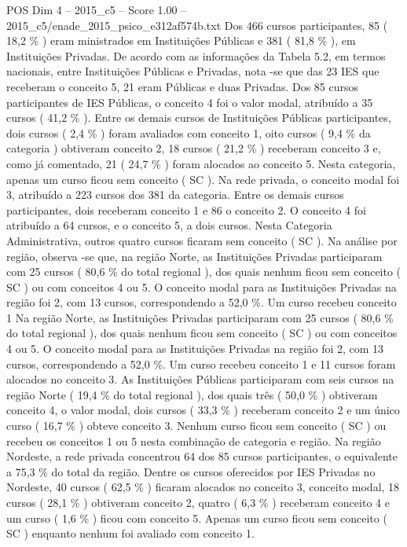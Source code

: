 \begin{textsample}{POS Dim 4 – 2015\_c5 – Score 1.00 – 2015\_c5/enade\_2015\_psico\_e312af574b.txt}
Dos 466 cursos participantes, 85 ( 18,2 \% ) eram ministrados em Instituições Públicas e 381 ( 81,8 \% ), em Instituições Privadas.
De acordo com as informações da Tabela 5.2, em termos nacionais, entre Instituições Públicas e Privadas, nota -se que das 23 IES que receberam o conceito 5, 21 eram Públicas e duas Privadas.
Dos 85 cursos participantes de IES Públicas, o conceito 4 foi o valor modal, atribuído a 35 cursos ( 41,2 \% ).
Entre os demais cursos de Instituições Públicas participantes, dois cursos ( 2,4 \% ) foram avaliados com conceito 1, oito cursos ( 9,4 \% da categoria ) obtiveram conceito 2, 18 cursos ( 21,2 \% ) receberam conceito 3 e, como já comentado, 21 ( 24,7 \% ) foram alocados ao conceito 5.
Nesta categoria, apenas um curso ficou sem conceito ( SC ).
Na rede privada, o conceito modal foi 3, atribuído a 223 cursos dos 381 da categoria.
Entre os demais cursos participantes, dois receberam conceito 1 e 86 o conceito 2.
O conceito 4 foi atribuído a 64 cursos, e o conceito 5, a dois cursos.
Nesta Categoria Administrativa, outros quatro cursos ficaram sem conceito ( SC ).
Na análise por região, observa -se que, na região Norte, as Instituições Privadas participaram com 25 cursos ( 80,6 \% do total regional ), dos quais nenhum ficou sem conceito ( SC ) ou com conceitos 4 ou 5.
O conceito modal para as Instituições Privadas na região foi 2, com 13 cursos, correspondendo a 52,0 \%.
Um curso recebeu conceito 1 Na região Norte, as Instituições Privadas participaram com 25 cursos ( 80,6 \% do total regional ), dos quais nenhum ficou sem conceito ( SC ) ou com conceitos 4 ou 5.
O conceito modal para as Instituições Privadas na região foi 2, com 13 cursos, correspondendo a 52,0 \%.
Um curso recebeu conceito 1 e 11 cursos foram alocados no conceito 3.
As Instituições Públicas participaram com seis cursos na região Norte ( 19,4 \% do total regional ), dos quais três ( 50,0 \% ) obtiveram conceito 4, o valor modal, dois cursos ( 33,3 \% ) receberam conceito 2 e um único curso ( 16,7 \% ) obteve conceito 3.
Nenhum curso ficou sem conceito ( SC ) ou recebeu os conceitos 1 ou 5 nesta combinação de categoria e região.
Na região Nordeste, a rede privada concentrou 64 dos 85 cursos participantes, o equivalente a 75,3 \% do total da região.
Dentre os cursos oferecidos por IES Privadas no Nordeste, 40 cursos ( 62,5 \% ) ficaram alocados no conceito 3, conceito modal, 18 cursos ( 28,1 \% ) obtiveram conceito 2, quatro ( 6,3 \% ) receberam conceito 4 e um curso ( 1,6 \% ) ficou com conceito 5.
Apenas um curso ficou sem conceito ( SC ) enquanto nenhum foi avaliado com conceito 1.

\end{textsample}
